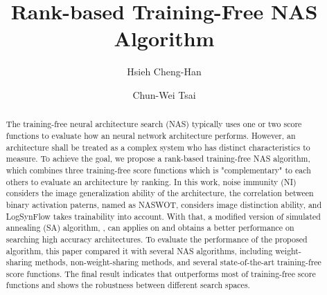 \documentclass[sigconf]{acmart}
\begin{document}
\title{Rank-based Training-Free NAS Algorithm}

\author{Hsieh Cheng-Han}

\author{Chun-Wei Tsai}

\begin{abstract}
    The training-free neural architecture search (NAS) typically uses one or 
    two score functions to evaluate how an neural network architecture performs. 
    However, an architecture shall be treated as a complex system who has 
    distinct characteristics to measure. 
    To achieve the goal, we propose a rank-based training-free NAS algorithm, 
    which combines three training-free score functions which is "complementary" 
    to each others to evaluate an architecture by ranking. 
    In this work, noise immunity (NI) considers the image generalization 
    ability of the architecture, the correlation between binary activation 
    paterns, named as NASWOT, considers image distinction ability, and LogSynFlow 
    takes trainability into account. With that, a modified version of simulated 
    annealing (SA) algorithm, \palg, can applies on and obtains a better 
    performance on searching high accuracy architectures. 
    To evaluate the performance of the proposed algorithm, this paper compared 
    it with several NAS algorithms, including weight-sharing methods, 
    non-weight-sharing methods, and several state-of-the-art training-free 
    score functions. The final result indicates that \palg outperforms most 
    of training-free score functions and shows the robustness between different 
    search spaces. 

\end{abstract}
\maketitle
\end{document}
